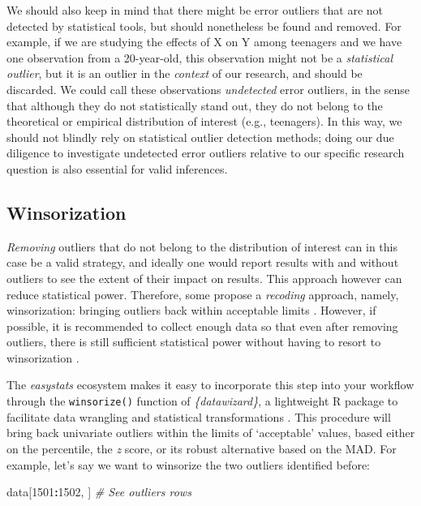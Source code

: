 \documentclass[sn-basic, lineno,pdflatex]{sn-jnl}
\newenvironment{Shaded}{\begin{snugshade}}{\end{snugshade}}
\newcommand{\CommentTok}[1]{\textcolor[rgb]{0.56,0.35,0.01}{\textit{#1}}}
\newcommand{\DecValTok}[1]{\textcolor[rgb]{0.00,0.00,0.81}{#1}}
\newcommand{\NormalTok}[1]{#1}
\newcommand{\SpecialCharTok}[1]{\textcolor[rgb]{0.81,0.36,0.00}{\textbf{#1}}}
\begin{document}
We should also keep in mind that there might be error outliers that are
not detected by statistical tools, but should nonetheless be found and
removed. For example, if we are studying the effects of X on Y among
teenagers and we have one observation from a 20-year-old, this
observation might not be a \emph{statistical outlier}, but it is an
outlier in the \emph{context} of our research, and should be discarded.
We could call these observations \emph{undetected} error outliers, in
the sense that although they do not statistically stand out, they do not
belong to the theoretical or empirical distribution of interest (e.g.,
teenagers). In this way, we should not blindly rely on statistical
outlier detection methods; doing our due diligence to investigate
undetected error outliers relative to our specific research question is
also essential for valid inferences.

\hypertarget{winsorization}{%
\subsection{Winsorization}\label{winsorization}}

\emph{Removing} outliers that do not belong to the distribution of
interest can in this case be a valid strategy, and ideally one would
report results with and without outliers to see the extent of their
impact on results. This approach however can reduce statistical power.
Therefore, some propose a \emph{recoding} approach, namely,
winsorization: bringing outliers back within acceptable limits
\citep[e.g., 3 MADs,][]{tukey1963less}. However, if possible, it is
recommended to collect enough data so that even after removing outliers,
there is still sufficient statistical power without having to resort to
winsorization \citep{leys2019outliers}.

The \emph{easystats} ecosystem makes it easy to incorporate this step
into your workflow through the \texttt{winsorize()} function of
\emph{\{datawizard\}}, a lightweight R package to facilitate data
wrangling and statistical transformations \citep{patil2022datawizard}.
This procedure will bring back univariate outliers within the limits of
`acceptable' values, based either on the percentile, the \emph{z} score,
or its robust alternative based on the MAD. For example, let's say we
want to winsorize the two outliers identified before:

\begin{Shaded}
\begin{Highlighting}[]
\NormalTok{data[}\DecValTok{1501}\SpecialCharTok{:}\DecValTok{1502}\NormalTok{, ]  }\CommentTok{\# See outliers rows}
\end{Highlighting}
\end{Shaded}
\end{document}
